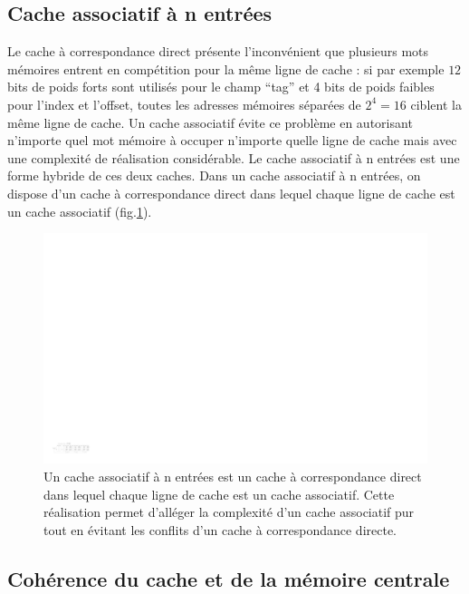 \subsection{Cache associatif à n entrées}

Le cache à correspondance direct présente l'inconvénient que plusieurs mots mémoires entrent en compétition pour la même ligne de cache : si par exemple $12$ bits de poids forts sont utilisés pour le champ ``tag'' et 4 bits de poids faibles pour l'index et l'offset, toutes les adresses mémoires séparées de $2^4 = 16$ ciblent la même ligne de cache. Un cache associatif évite ce problème en autorisant n'importe quel mot mémoire à occuper n'importe quelle ligne de cache mais avec une complexité de réalisation considérable. Le cache associatif à n entrées est une forme hybride de ces deux caches. Dans un cache associatif à n entrées, on dispose d'un cache à correspondance direct dans lequel chaque ligne de cache est un cache associatif (fig.\ref{fig:cache_nway}). 

\begin{figure}[htbp]
\centering\includegraphics[width=\linewidth]{Figs/nway_cache.pdf}
\caption{\label{fig:cache_nway} Un cache associatif à n entrées est un cache à correspondance direct dans lequel chaque ligne de cache est un cache associatif. Cette réalisation permet d'alléger la complexité d'un cache associatif pur tout en évitant les conflits d'un cache à correspondance directe.}
\end{figure}

\subsection{Cohérence du cache et de la mémoire centrale}

